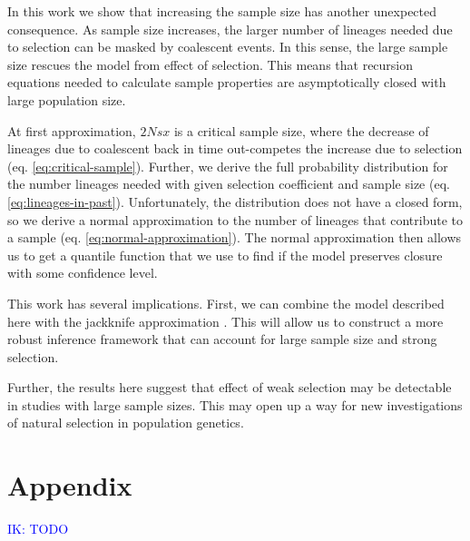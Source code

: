 \documentclass[review]{elsarticle}
\newcommand{\ikcomment}[1]{\textcolor{blue}{IK: #1}}
\begin{document}
In this work we show that increasing the sample size has another unexpected consequence. As sample
size increases, the larger number of lineages needed due to selection can be masked by coalescent
events. In this sense, the large sample size rescues the model from effect of selection. This means
that recursion equations needed to calculate sample properties are asymptotically closed with large
population size.

At first approximation, $2Nsx$ is a critical sample size, where the decrease of lineages due to
coalescent back in time out-competes the increase due to selection (eq. \eqref{eq:critical-sample}).
Further, we derive the full probability distribution for the number lineages needed with given
selection coefficient and sample size (eq. \eqref{eq:lineages-in-past}). Unfortunately, the
distribution does not have a closed form, so we derive a normal approximation to the number of
lineages that contribute to a sample (eq. \eqref{eq:normal-approximation}). The normal approximation
then allows us to get a quantile function that we use to find if the model preserves closure with
some confidence level.

This work has several implications. First, we can combine the model described here with the
jackknife approximation \citep{JouganousEtAl2017}. This will allow us to construct a more robust
inference framework that can account for large sample size and strong selection.

Further, the results here suggest that effect of weak selection may be detectable in studies with
large sample sizes. This may open up a way for new investigations of natural selection in population
genetics.

\section{Appendix}

\ikcomment{TODO}



\end{document}
